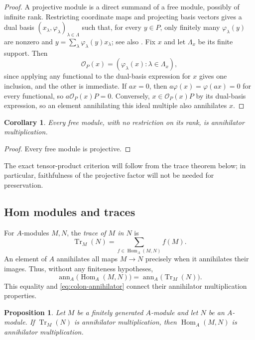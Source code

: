 \documentclass[11pt]{amsart}
\theoremstyle{plain}
\newtheorem{proposition}[theorem]{Proposition}
\newtheorem{corollary}[theorem]{Corollary}
\theoremstyle{definition}
\theoremstyle{remark}
\DeclareMathOperator{\Hom}{Hom}
\DeclareMathOperator{\Tr}{Tr}
\newcommand{\ann}{\operatorname{ann}}
\numberwithin{equation}{section}
\begin{document}
\begin{proof}
A projective module is a direct summand of a free module, possibly of
infinite rank. Restricting coordinate maps and projecting basis vectors
gives a dual basis $(x_\lambda,\varphi_\lambda)_{\lambda\in\Lambda}$
such that, for every $y\in P$, only finitely many
$\varphi_\lambda(y)$ are nonzero and
$y=\sum_\lambda\varphi_\lambda(y)x_\lambda$; see also \cite{WK24}.
Fix $x$ and let $\Lambda_x$ be its finite support. Then
\[
 \mathcal O_P(x)=(\varphi_\lambda(x):\lambda\in\Lambda_x),
\]
since applying any functional to the dual-basis expression for $x$
gives one inclusion, and the other is immediate.
If $ax=0$, then $a\varphi(x)=\varphi(ax)=0$ for every functional,
so $a\mathcal O_P(x)P=0$. Conversely, $x\in\mathcal O_P(x)P$
by its dual-basis expression, so an element annihilating this ideal
multiple also annihilates $x$.
\end{proof}

\begin{corollary}
Every free module, with no restriction on its rank, is annihilator
multiplication.
\end{corollary}

\begin{proof}
Every free module is projective.
\end{proof}

The exact tensor-product criterion will follow from the trace theorem
below; in particular, faithfulness of the projective factor will not be
needed for preservation.

\subsection{Hom modules and traces}

For $A$-modules $M,N$, the \emph{trace of $M$ in $N$} is
\[
\Tr_M(N)=\sum_{f\in\Hom_A(M,N)}f(M).
\]
An element of $A$ annihilates all maps $M\to N$ precisely when it annihilates
their images. Thus, without any finiteness hypotheses,
\begin{equation}\label{eq:hom-trace-annihilator}
\ann_A\bigl(\Hom_A(M,N)\bigr)=\ann_A\bigl(\Tr_M(N)\bigr).
\end{equation}
This equality and \eqref{eq:colon-annihilator} connect their annihilator
multiplication properties.

\begin{proposition}\label{prop:trace-hom}\label{prophom}
Let $M$ be a finitely generated $A$-module and let $N$ be an $A$-module.
If $\Tr_M(N)$ is annihilator multiplication, then $\Hom_A(M,N)$ is
annihilator multiplication.
\end{proposition}
\end{document}
